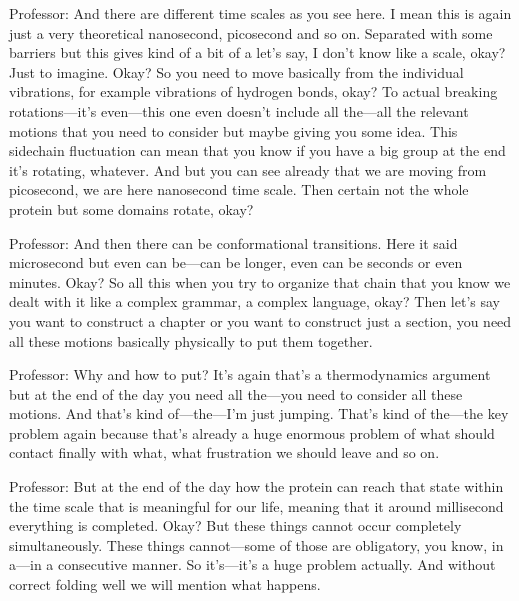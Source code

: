 Professor: And there are different time scales as you see here. I mean this is again just a very theoretical nanosecond, picosecond and so on. Separated with some barriers but this gives kind of a bit of a let’s say, I don’t know like a scale, okay? Just to imagine. Okay? So you need to move basically from the individual vibrations, for example vibrations of hydrogen bonds, okay? To actual breaking rotations—it’s even—this one even doesn’t include all the—all the relevant motions that you need to consider but maybe giving you some idea. This sidechain fluctuation can mean that you know if you have a big group at the end it’s rotating, whatever. And but you can see already that we are moving from picosecond, we are here nanosecond time scale. Then certain not the whole protein but some domains rotate, okay?

Professor: And then there can be conformational transitions. Here it said microsecond but even can be—can be longer, even can be seconds or even minutes. Okay? So all this when you try to organize that chain that you know we dealt with it like a complex grammar, a complex language, okay? Then let’s say you want to construct a chapter or you want to construct just a section, you need all these motions basically physically to put them together.

Professor: Why and how to put? It’s again that’s a thermodynamics argument but at the end of the day you need all the—you need to consider all these motions. And that’s kind of—the—I’m just jumping. That’s kind of the—the key problem again because that’s already a huge enormous problem of what should contact finally with what, what frustration we should leave and so on.

Professor: But at the end of the day how the protein can reach that state within the time scale that is meaningful for our life, meaning that it around millisecond everything is completed. Okay? But these things cannot occur completely simultaneously. These things cannot—some of those are obligatory, you know, in a—in a consecutive manner. So it’s—it’s a huge problem actually. And without correct folding well we will mention what happens.



